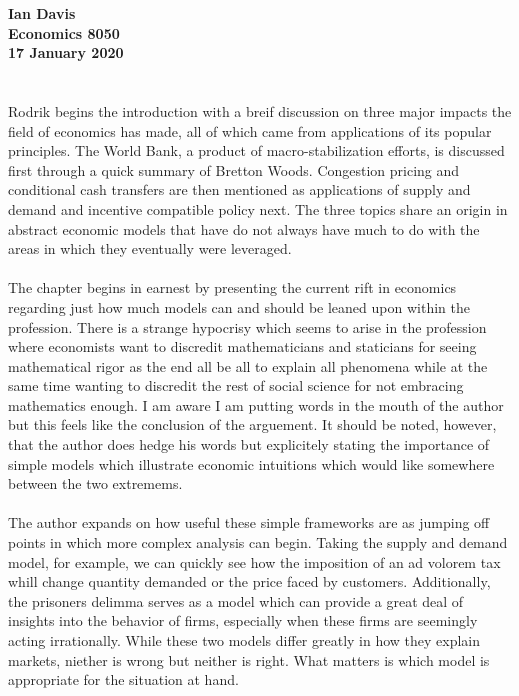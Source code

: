 
\let\counterwithout\relax
\let\counterwithin\relax
{}


\noindent \textbf{Ian Davis}\\
\noindent \textbf{Economics 8050}\\
\noindent \textbf{17 January 2020}\\
\\
\\
\indent Rodrik begins the introduction with a breif discussion on three major impacts the field of economics has made, all of which came from applications of its popular principles. The World Bank, a product of macro-stabilization efforts, is discussed first through a quick summary of Bretton Woods. Congestion pricing and conditional cash transfers are then mentioned as applications of supply and demand and incentive compatible policy next. The three topics share an origin in abstract economic models that have do not always have much to do with the areas in which they eventually were leveraged.\\
\\
\indent The chapter begins in earnest by presenting the current rift in economics regarding just how much models can and should be leaned upon within the profession. There is a strange hypocrisy which seems to arise in the profession where economists want to discredit mathematicians and staticians for seeing mathematical rigor as the end all be all to explain all phenomena while at the same time wanting to discredit the rest of social science for not embracing mathematics enough. I am aware I am putting words in the mouth of the author but this feels like the conclusion of the arguement. It should be noted, however, that the author does hedge his words but explicitely stating the importance of simple models which illustrate economic intuitions which would like somewhere between the two extremems.\\
\\
\indent The author expands on how useful these simple frameworks are as jumping off points in which more complex analysis can begin. Taking the supply and demand model, for example, we can quickly see how the imposition of an ad volorem tax whill change quantity demanded or the price faced by customers. Additionally, the prisoners delimma serves as a model which can provide a great deal of insights into the behavior of firms, especially when these firms are seemingly acting irrationally. While these two models differ greatly in how they explain markets, niether is wrong but neither is right. What matters is which model is appropriate for the situation at hand.\\
